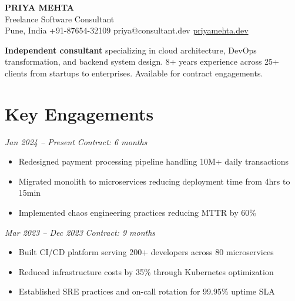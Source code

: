 \documentclass[10pt,letterpaper]{article}
\begin{document}
\begin{center}
{\LARGE\bfseries\color{teal} PRIYA MEHTA}\\[4pt]
{\large Freelance Software Consultant}\\[6pt]
{\small {} Pune, India \quad {} +91-87654-32109 \quad {} priya@consultant.dev \quad {} \href{https://priyamehta.dev}{priyamehta.dev}}
\end{center}

\vspace{6pt}
\begin{tcolorbox}
\textbf{Independent consultant} specializing in cloud architecture, DevOps transformation, and backend system design. 8+ years experience across 25+ clients from startups to enterprises. Available for contract engagements.
\end{tcolorbox}

\section{Key Engagements}

\begin{tcolorbox}[title={\textbf{Razorpay} -- Cloud Architecture Consultant},colbacktitle=teal,coltitle=white]
\textit{Jan 2024 -- Present} \hfill \textit{Contract: 6 months}
\begin{itemize}
\item Redesigned payment processing pipeline handling 10M+ daily transactions
\item Migrated monolith to microservices reducing deployment time from 4hrs to 15min
\item Implemented chaos engineering practices reducing MTTR by 60\%
\end{itemize}
\end{tcolorbox}

\vspace{4pt}
\begin{tcolorbox}[title={\textbf{Swiggy} -- DevOps Transformation Lead},colbacktitle=teal,coltitle=white]
\textit{Mar 2023 -- Dec 2023} \hfill \textit{Contract: 9 months}
\begin{itemize}
\item Built CI/CD platform serving 200+ developers across 80 microservices
\item Reduced infrastructure costs by 35\% through Kubernetes optimization
\item Established SRE practices and on-call rotation for 99.95\% uptime SLA
\end{itemize}
\end{tcolorbox}
\end{document}

